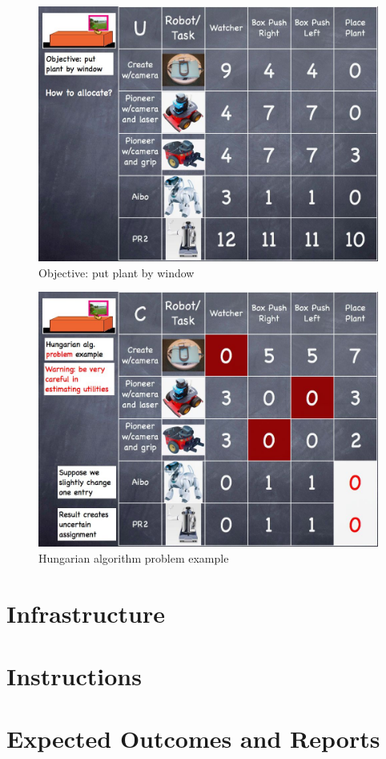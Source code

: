 \begin{figure}[!h]
\centering
\includegraphics[width=0.8\columnwidth]{figures/10_plant.jpg}
\caption{Objective: put plant by window}
\end{figure}

\begin{figure}[!h]
\centering
\includegraphics[width=0.8\columnwidth]{figures/10_hungarian.jpg}
\caption{Hungarian algorithm problem example}
\end{figure}

\section{Infrastructure}

\section{Instructions}

\section{Expected Outcomes and Reports}

\newpage
